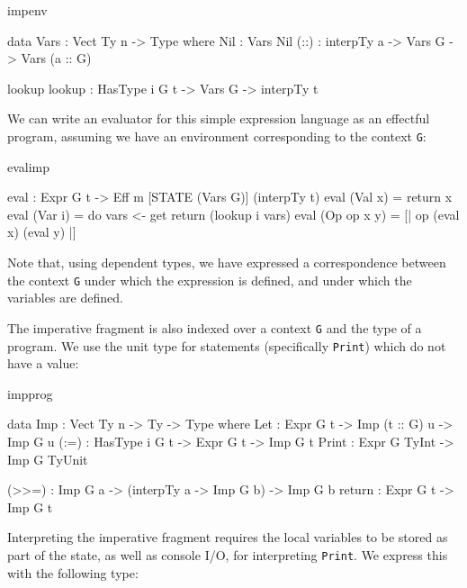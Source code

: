 \begin{SaveVerbatim}{impenv}

data Vars : Vect Ty n -> Type where
     Nil  : Vars Nil
     (::) : interpTy a -> Vars G -> Vars (a :: G)
\end{SaveVerbatim}

\begin{SaveVerbatim}{lookup}
lookup : HasType i G t -> Vars G -> interpTy t

\end{SaveVerbatim}

\noindent
We can write an evaluator for this simple expression language as an 
effectful program, assuming we have an environment corresponding to
the context \texttt{G}:

\begin{SaveVerbatim}{evalimp}

eval : Expr G t -> Eff m [STATE (Vars G)] (interpTy t)
eval (Val x) = return x
eval (Var i) = do vars <- get
                  return (lookup i vars) 
eval (Op op x y) = [| op (eval x) (eval y) |]

\end{SaveVerbatim}

\noindent
Note that, using dependent types, we have expressed a correspondence between
the context \texttt{G} under which the expression is defined, and under which
the variables are defined.


The imperative fragment is also indexed over a context \texttt{G} and the
type of a program. We use the unit type for statements (specifically
\texttt{Print}) which do not have a value:

\begin{SaveVerbatim}{impprog}

data Imp    : Vect Ty n -> Ty -> Type where
     Let    : Expr G t -> Imp (t :: G) u -> Imp G u
     (:=)   : HasType i G t -> Expr G t -> Imp G t
     Print  : Expr G TyInt -> Imp G TyUnit

     (>>=)  : Imp G a -> 
              (interpTy a -> Imp G b) -> Imp G b 
     return : Expr G t -> Imp G t

\end{SaveVerbatim}

\noindent
Interpreting the imperative fragment requires the local variables to be
stored as part of the state, as well as console I/O, for interpreting
\texttt{Print}. We express this with the following type:

